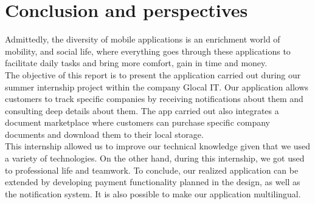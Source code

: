 
\chapter*{Conclusion and perspectives }
%
Admittedly, the diversity of mobile applications is an enrichment
world of mobility, and social life, where everything goes through these applications
to facilitate daily tasks and bring more comfort, gain in
time and money.\\
The objective of this report is to present the application carried out
during our summer internship project within the company Glocal IT.
Our application allows customers to track specific companies by receiving notifications about them and consulting deep details about them. The app
carried out also integrates a document marketplace where customers can purchase specific company documents and download them to their local storage.\\
This internship allowed us to improve our technical knowledge given
that we used a variety of technologies.
On the other hand, during this
internship, we got used to professional life and teamwork.
To conclude, our realized application can be extended by developing
payment functionality planned in the design, as well as the notification system.
It is also possible to make our application multilingual.